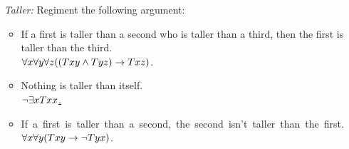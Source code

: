 \documentclass[a4paper, 11pt]{article} %
\begin{document}
\begin{enumerate}
  \item[\it Taller:] Regiment the following argument:
    \begin{itemize}
      \item If a first is taller than a second who is taller than a third, then the first is taller than the third.\\
        $\forall x\forall y\forall z((Txy \wedge Tyz) \rightarrow Txz)$.
      \item Nothing is taller than itself.\\
        \underline{$\neg\exists xTxx$.\quad}
      \item \mbox{If a first is taller than a second, the second isn't taller than the first.}\\
        $\forall x\forall y(Txy \rightarrow \neg Tyx)$.
    \end{itemize}
\end{enumerate}
\end{document}
